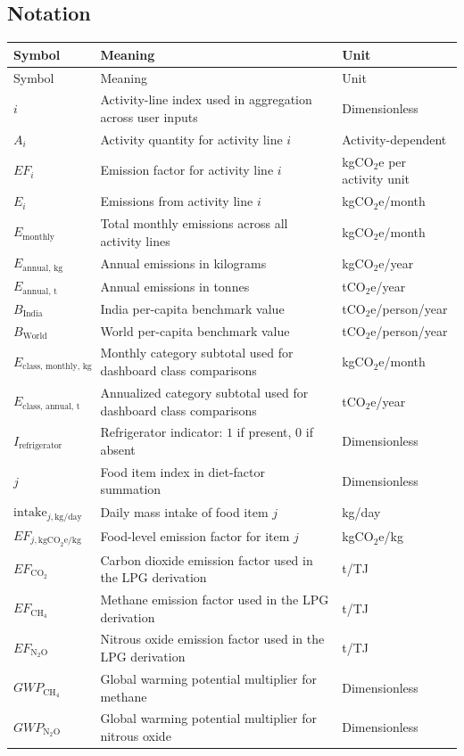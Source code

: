 \documentclass[11pt,a4paper]{article}
\begin{document}
\subsection{Notation}
\begin{longtable}{p{3cm} p{8cm} p{3cm}}
\toprule
Symbol & Meaning & Unit \\
\midrule
\endfirsthead
\toprule
Symbol & Meaning & Unit \\
\midrule
\endhead
\(i\) & Activity-line index used in aggregation across user inputs & Dimensionless \\
\(A_i\) & Activity quantity for activity line \(i\) & Activity-dependent \\
\(EF_i\) & Emission factor for activity line \(i\) & kgCO\(_2\)e per activity unit \\
\(E_i\) & Emissions from activity line \(i\) & kgCO\(_2\)e/month \\
\(E_{\text{monthly}}\) & Total monthly emissions across all activity lines & kgCO\(_2\)e/month \\
\(E_{\text{annual, kg}}\) & Annual emissions in kilograms & kgCO\(_2\)e/year \\
\(E_{\text{annual, t}}\) & Annual emissions in tonnes & tCO\(_2\)e/year \\
\(B_{\text{India}}\) & India per-capita benchmark value & tCO\(_2\)e/person/year \\
\(B_{\text{World}}\) & World per-capita benchmark value & tCO\(_2\)e/person/year \\
\(E_{\text{class, monthly, kg}}\) & Monthly category subtotal used for dashboard class comparisons & kgCO\(_2\)e/month \\
\(E_{\text{class, annual, t}}\) & Annualized category subtotal used for dashboard class comparisons & tCO\(_2\)e/year \\
\(I_{\text{refrigerator}}\) & Refrigerator indicator: \(1\) if present, \(0\) if absent & Dimensionless \\
\(j\) & Food item index in diet-factor summation & Dimensionless \\
\(\text{intake}_{j,\text{kg/day}}\) & Daily mass intake of food item \(j\) & kg/day \\
\(EF_{j,\text{kgCO}_2\text{e/kg}}\) & Food-level emission factor for item \(j\) & kgCO\(_2\)e/kg \\
\(EF_{\text{CO}_2}\) & Carbon dioxide emission factor used in the LPG derivation & t/TJ \\
\(EF_{\text{CH}_4}\) & Methane emission factor used in the LPG derivation & t/TJ \\
\(EF_{\text{N}_2\text{O}}\) & Nitrous oxide emission factor used in the LPG derivation & t/TJ \\
\(GWP_{\text{CH}_4}\) & Global warming potential multiplier for methane & Dimensionless \\
\(GWP_{\text{N}_2\text{O}}\) & Global warming potential multiplier for nitrous oxide & Dimensionless \\
\bottomrule
\end{longtable}
\end{document}
